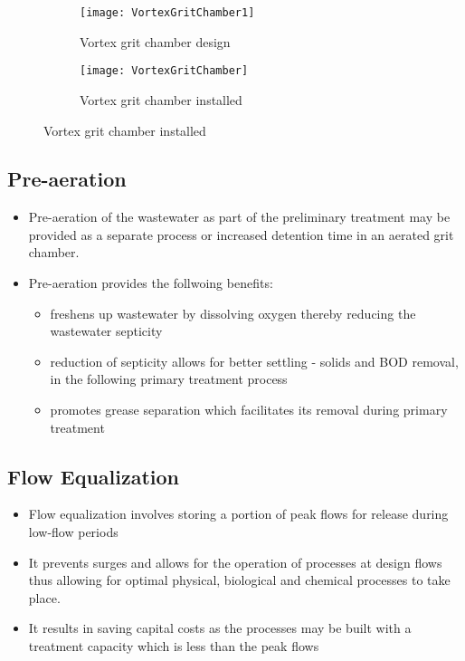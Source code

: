 \begin{figure}[h!]
  \centering
  \begin{subfigure}[b]{0.47\linewidth}
    \texttt{[image: VortexGritChamber1]}
    \caption{Vortex grit chamber design}
  \end{subfigure}
  \hspace{0.2cm}
  \begin{subfigure}[b]{0.43\linewidth}
    \texttt{[image: VortexGritChamber]}
    \caption{Vortex grit chamber installed}
  \end{subfigure}
\end{figure} 

\subsection{Pre-aeration}	
	\begin{itemize}
		\item Pre-aeration of the wastewater as part of the preliminary treatment may be provided as a separate process or increased detention time in an aerated grit chamber.
		\item Pre-aeration provides the follwoing benefits:
			\begin{itemize}
				\item freshens up wastewater by dissolving oxygen thereby reducing the wastewater septicity
				\item reduction of septicity allows for better settling - solids and BOD removal, in the following primary treatment process
				\item promotes grease separation which facilitates its removal during primary treatment
			\end{itemize}
	\end{itemize}
\subsection{Flow Equalization}	

	\begin{itemize}
		\item Flow equalization involves storing a portion of peak flows for release during low-flow periods
		\item It prevents surges and allows for the operation of processes at design flows thus allowing for optimal physical, biological and chemical processes to take place.
		\item It results in saving capital costs as the processes may be built with a treatment capacity which is less than the peak flows
	\end{itemize}
\newpage
